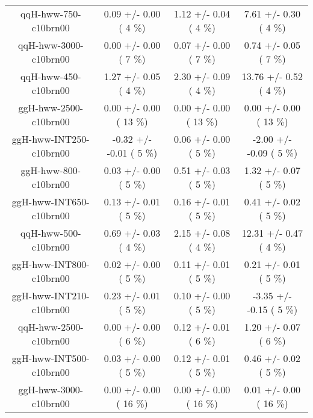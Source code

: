 \begin{table}[h!]
\begin{center}
{\begin{tabular}{
c| c | c | c | }
 qqH-hww-750-c10brn00   &       0.09 +/-       0.00 (         4 \%)   &       1.12 +/-       0.04 (         4 \%)   &       7.61 +/-       0.30 (         4 \%)  \\
 qqH-hww-3000-c10brn00   &       0.00 +/-       0.00 (         7 \%)   &       0.07 +/-       0.00 (         7 \%)   &       0.74 +/-       0.05 (         7 \%)  \\
 qqH-hww-450-c10brn00   &       1.27 +/-       0.05 (         4 \%)   &       2.30 +/-       0.09 (         4 \%)   &      13.76 +/-       0.52 (         4 \%)  \\
 ggH-hww-2500-c10brn00   &       0.00 +/-       0.00 (        13 \%)   &       0.00 +/-       0.00 (        13 \%)   &       0.00 +/-       0.00 (        13 \%)  \\
 ggH-hww-INT250-c10brn00   &      -0.32 +/-      -0.01 (         5 \%)   &       0.06 +/-       0.00 (         5 \%)   &      -2.00 +/-      -0.09 (         5 \%)  \\
 ggH-hww-800-c10brn00   &       0.03 +/-       0.00 (         5 \%)   &       0.51 +/-       0.03 (         5 \%)   &       1.32 +/-       0.07 (         5 \%)  \\
 ggH-hww-INT650-c10brn00   &       0.13 +/-       0.01 (         5 \%)   &       0.16 +/-       0.01 (         5 \%)   &       0.41 +/-       0.02 (         5 \%)  \\
 qqH-hww-500-c10brn00   &       0.69 +/-       0.03 (         4 \%)   &       2.15 +/-       0.08 (         4 \%)   &      12.31 +/-       0.47 (         4 \%)  \\
 ggH-hww-INT800-c10brn00   &       0.02 +/-       0.00 (         5 \%)   &       0.11 +/-       0.01 (         5 \%)   &       0.21 +/-       0.01 (         5 \%)  \\
 ggH-hww-INT210-c10brn00   &       0.23 +/-       0.01 (         5 \%)   &       0.10 +/-       0.00 (         5 \%)   &      -3.35 +/-      -0.15 (         5 \%)  \\
 qqH-hww-2500-c10brn00   &       0.00 +/-       0.00 (         6 \%)   &       0.12 +/-       0.01 (         6 \%)   &       1.20 +/-       0.07 (         6 \%)  \\
 ggH-hww-INT500-c10brn00   &       0.03 +/-       0.00 (         5 \%)   &       0.12 +/-       0.01 (         5 \%)   &       0.46 +/-       0.02 (         5 \%)  \\
 ggH-hww-3000-c10brn00   &       0.00 +/-       0.00 (        16 \%)   &       0.00 +/-       0.00 (        16 \%)   &       0.01 +/-       0.00 (        16 \%)  \\

\end{tabular}}
\end{center}
\end{table}
